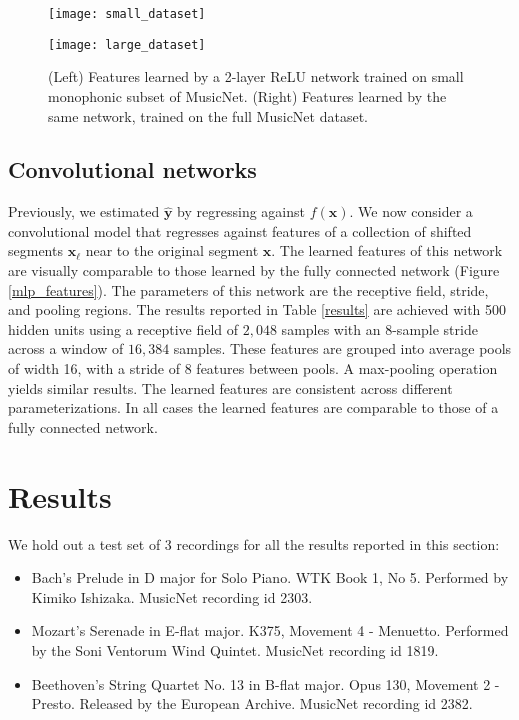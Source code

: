 \documentclass{article} \usepackage{iclr2017_conference,times}
\begin{document}
\begin{figure}[h]
  \centering
  
  \begin{minipage}{.5\textwidth}
  \centering
  \texttt{[image: small\_dataset]}
\end{minipage}\begin{minipage}{.5\textwidth}
\centering
  \texttt{[image: large\_dataset]}
\end{minipage}

  \caption{(Left) Features learned by a 2-layer ReLU network trained on small monophonic subset of MusicNet. (Right) Features learned by the same network, trained on the full MusicNet dataset.}
    \label{regularization}
\end{figure}

\subsection{Convolutional networks}

Previously, we estimated $\mathbf{\hat y}$ by regressing against $f(\mathbf{x})$. We now consider a convolutional model that regresses against features of a collection of shifted segments $\mathbf{x}_\ell$ near to the original segment $\mathbf{x}$. The learned features of this network are visually comparable to those learned by the fully connected network (Figure \ref{mlp_features}). The parameters of this network are the receptive field, stride, and pooling regions. The results reported in Table \ref{results} are achieved with 500 hidden units using a receptive field of $2,048$ samples with an 8-sample stride across a window of $16,384$ samples. These features are grouped into average pools of width 16, with a stride of 8 features between pools. A max-pooling operation yields similar results. The learned features are consistent across different parameterizations. In all cases the learned features are comparable to those of a fully connected network.
 \section{Results}

We hold out a test set of 3 recordings for all the results reported in this section:
\begin{itemize}[itemsep=0pt,topsep=0pt,parsep=0pt,partopsep=0pt]
\item Bach's Prelude in D major for Solo Piano. WTK Book 1, No 5. Performed by Kimiko Ishizaka. MusicNet recording id 2303.
\item Mozart's Serenade in E-flat major. K375, Movement 4 - Menuetto. Performed by the Soni Ventorum Wind Quintet. MusicNet recording id 1819.
\item Beethoven's String Quartet No. 13 in B-flat major. Opus 130, Movement 2 - Presto. Released by the European Archive. MusicNet recording id 2382.
\end{itemize}
\end{document}
